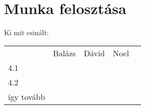 \section{Munka felosztása}\label{sec:munka-felosztasa}

Ki mit csinált:
\begin{table}[]
    \begin{tabular}{lllll}
        & Balázs & Dávid & Noel &  \\
        4.1        &        &       &      &  \\
        4.2        &        &       &      &  \\
        így tovább &        &       &      &
    \end{tabular}
\end{table}